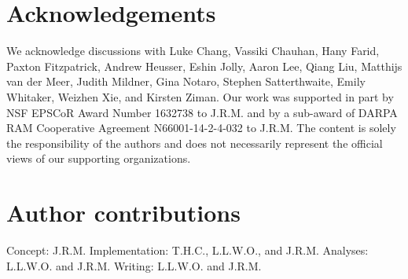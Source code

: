 \documentclass[english]{article}
\begin{document}
\section*{Acknowledgements}
We acknowledge discussions with Luke Chang, Vassiki Chauhan, Hany
Farid, Paxton Fitzpatrick, Andrew Heusser, Eshin Jolly, Aaron Lee,
Qiang Liu, Matthijs van der Meer, Judith Mildner, Gina Notaro, Stephen
Satterthwaite, Emily Whitaker, Weizhen Xie, and Kirsten Ziman. Our
work was supported in part by NSF EPSCoR Award Number 1632738 to
J.R.M. and by a sub-award of DARPA RAM Cooperative Agreement
N66001-14-2-4-032 to J.R.M.  The content is solely the responsibility
of the authors and does not necessarily represent the official views
of our supporting organizations.

\section*{Author contributions}
Concept: J.R.M.  Implementation: T.H.C., L.L.W.O., and J.R.M.
Analyses: L.L.W.O. and J.R.M.  Writing: L.L.W.O. and J.R.M.



\end{document}
